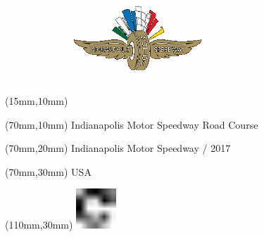 \null\newpage
\begin{textblock*}{50mm}(15mm,10mm)%
\includegraphics[width=50mm]{LG/IND.png}
\end{textblock*}
\begin{textblock*}{130mm}(70mm,10mm)%
{\fontsize{20}{20}\selectfont Indianapolis Motor Speedway Road Course}\\
\end{textblock*}
\begin{textblock*}{120mm}(70mm,20mm)%
{\fontsize{16}{16}\selectfont Indianapolis Motor Speedway / 2017}\\
\end{textblock*}
\begin{textblock*}{120mm}(70mm,30mm)%
{\fontsize{12}{12}\selectfont USA}
\end{textblock*}
\begin{textblock*}{30mm}(110mm,30mm)%
\centering
\includegraphics[height=15mm]{icons/fa-rotate-right.pdf}
\end{textblock*}
